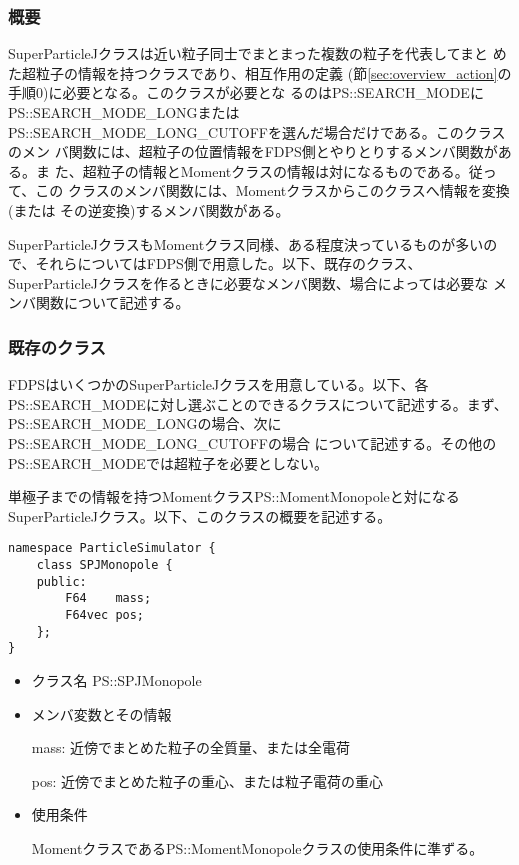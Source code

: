 \subsubsection{概要}

SuperParticleJクラスは近い粒子同士でまとまった複数の粒子を代表してまと
めた超粒子の情報を持つクラスであり、相互作用の定義
(節\ref{sec:overview_action}の手順0)に必要となる。このクラスが必要とな
るのはPS::SEARCH\_MODEにPS::SEARCH\_MODE\_LONGまたは\\
PS::SEARCH\_MODE\_LONG\_CUTOFFを選んだ場合だけである。このクラスのメン
バ関数には、超粒子の位置情報をFDPS側とやりとりするメンバ関数がある。ま
た、超粒子の情報とMomentクラスの情報は対になるものである。従って、この
クラスのメンバ関数には、Momentクラスからこのクラスへ情報を変換(または
その逆変換)するメンバ関数がある。

SuperParticleJクラスもMomentクラス同様、ある程度決っているものが多いの
で、それらについてはFDPS側で用意した。以下、既存のクラス、
SuperParticleJクラスを作るときに必要なメンバ関数、場合によっては必要な
メンバ関数について記述する。

\subsubsection{既存のクラス}

FDPSはいくつかのSuperParticleJクラスを用意している。以下、各
PS::SEARCH\_MODEに対し選ぶことのできるクラスについて記述する。まず、
PS::SEARCH\_MODE\_LONGの場合、次にPS::SEARCH\_MODE\_LONG\_CUTOFFの場合
について記述する。その他の\\PS::SEARCH\_MODEでは超粒子を必要としない。



単極子までの情報を持つMomentクラスPS::MomentMonopoleと対になる
SuperParticleJクラス。以下、このクラスの概要を記述する。
\begin{screen}
\begin{verbatim}
namespace ParticleSimulator {
    class SPJMonopole {
    public:
        F64    mass;
        F64vec pos;
    };
}
\end{verbatim}
\end{screen}

\begin{itemize}
\item クラス名
  PS::SPJMonopole

\item メンバ変数とその情報

  mass: 近傍でまとめた粒子の全質量、または全電荷

  pos: 近傍でまとめた粒子の重心、または粒子電荷の重心

\item 使用条件

  MomentクラスであるPS::MomentMonopoleクラスの使用条件に準ずる。

\end{itemize}

